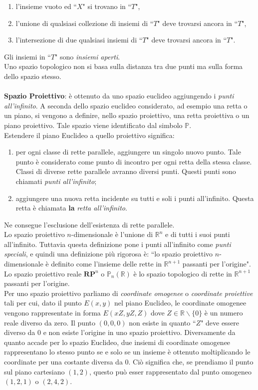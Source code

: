 \documentclass[a4paper,12pt]{tesiinfo}
\begin{document}
\begin{enumerate}
  \item l'insieme vuoto ed ``$X$" si trovano in ``$T$",
  \item l'unione di qualsiasi collezione di insiemi di ``$T$" deve trovarsi ancora in ``$T$",
  \item l'intersezione di due qualsiasi insiemi di ``$T$" deve trovarsi ancora in ``$T$".
\end{enumerate}
Gli insiemi in ``$T$" sono \textit{insiemi aperti}.
\\
Uno spazio topologico non si basa sulla distanza tra due punti ma sulla forma dello spazio stesso.
\\
\\
%
%
%
\textbf{Spazio Proiettivo}: \`e ottenuto da uno spazio euclideo aggiungendo i \textit{punti all'infinito}. A seconda dello spazio euclideo considerato, ad esempio una retta o un piano, si vengono a definire, nello spazio proiettivo, una retta proiettiva o un piano proiettivo. Tale spazio viene identificato dal simbolo $\mathbb{P}$.
\\
Estendere il piano Euclideo a quello proiettivo significa:
\begin{enumerate}
  \item per ogni classe di rette parallele, aggiungere un singolo nuovo punto. Tale punto \`e considerato come punto di incontro per ogni retta della stessa classe. Classi di diverse rette parallele avranno diversi punti. Questi punti sono chiamati \textit{punti all'infinito};
  \item aggiungere una nuova retta incidente su tutti e soli i punti all'infinito. Questa retta \`e chiamata \textbf{la} \textit{retta all'infinito}.
\end{enumerate}
Ne consegue l'esclusione dell'esistenza di rette parallele.
\\
Lo spazio proiettivo $n$-dimensionale \`e l'unione di $\mathbb{R}^n$ e di tutti i suoi punti all'infinito. Tuttavia questa definizione pone i punti all'infinito come \textit{punti speciali}, e quindi una definizione pi\`u rigorosa \`e: ``lo spazio proiettivo $n$-dimensionale \`e definito come l'insieme delle rette in $\mathbb{R}^ {n+1}$ passanti per l'origine".
\\
Lo spazio proiettivo reale $\textbf{RP}^n$ o $\mathbb{P}_n(\mathbb{R})$ \`e lo spazio topologico di rette in $\mathbb{R}^ {n+1}$ passanti per l'origine.
\\
Per uno spazio proiettivo parliamo di \textit{coordinate omogenee} o \textit{coordinate proiettive} tali per cui, dato il punto $E(x, y)$ nel piano Euclideo, le coordinate omogenee vengono rappresentate in forma $E(xZ, yZ, Z)$ dove $Z \in \mathbb{R} \backslash \{0\}$ \`e un numero reale diverso da zero. Il punto $(0, 0, 0)$ non esiste in quanto ``$Z$" deve essere diverso da $0$ e non esiste l'origine in uno spazio proiettivo. Diversamente da quanto accade per lo spazio Euclideo, due insiemi di coordinate omogenee rappresentano lo stesso punto se e solo se un insieme \`e ottenuto moltiplicando le coordinate per una costante diversa da 0. Ci\`o significa che, se prendiamo il punto sul piano cartesiano $(1, 2)$, questo pu\`o esser rappresentato dal punto omogeneo $(1, 2, 1)$ o $(2, 4, 2)$.\\
\end{document}
